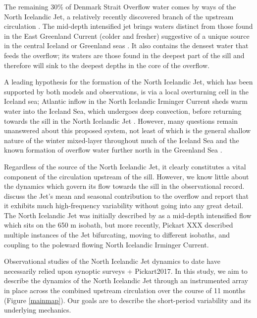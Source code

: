 \documentclass[12pt,titlepage,figuresatend]{article}
\begin{document}
The remaining 30\% of Denmark Strait Overflow water comes by ways of the North Icelandic Jet, a relatively recently discovered branch of the upstream circulation \cite[]{Steingrimur2004,Vage2011}. The mid-depth intensified jet brings waters distinct from those found in the East Greenland Current (colder and fresher) suggestive of a unique source in the central Iceland or Greenland seas \cite[]{Vage2011,Vage2015,Harden2016}. It also contains the densest water that feeds the overflow; its waters are those found in the deepest part of the sill \cite[]{Mastropole2017} and therefore will sink to the deepest depths in the core of the overflow.

A leading hypothesis for the formation of the North Icelandic Jet, which has been supported by both models and observations, is via a local overturning cell in the Iceland sea; Atlantic inflow in the North Icelandic Irminger Current sheds warm water into the Iceland Sea, which undergoes deep convection, before returning towards the sill in the North Icelandic Jet \cite[]{Vage2011,Behrens2017}. However, many questions remain unanswered about this proposed system, not least of which is the general shallow nature of the winter mixed-layer throughout much of the Iceland Sea \cite[]{Vage2015} and the known formation of overflow water further north in the Greenland Sea \cite[]{Strass1993,Rudels2002}.

Regardless of the source of the North Icelandic Jet, it clearly constitutes a vital component of the circulation upstream of the sill. However, we know little about the dynamics which govern its flow towards the sill in the observational record. \cite{Harden2016} discuss the Jet's mean and seasonal contribution to the overflow and report that it exhibits much high-frequency variability without going into any great detail. The North Icelandic Jet was initially described by \cite{Steingrimur2004} as a mid-depth intensified flow which sits on the 650 m isobath, but more recently, Pickart XXX described multiple instances of the Jet bifurcating, moving to different isobaths, and coupling to the poleward flowing North Icelandic Irminger Current.

Observational studies of the North Icelandic Jet dynamics to date have necessarily relied upon synoptic surveys \cite[]{Steingrimur2004,Vage2011} + Pickart2017. In this study, we aim to describe the dynamics of the North Icelandic Jet through an instrumented array in place across the combined upstream circulation over the course of 11 months (Figure \ref{mainmap}).  Our goals are to describe the short-period variability and its underlying mechanics.
\end{document}
